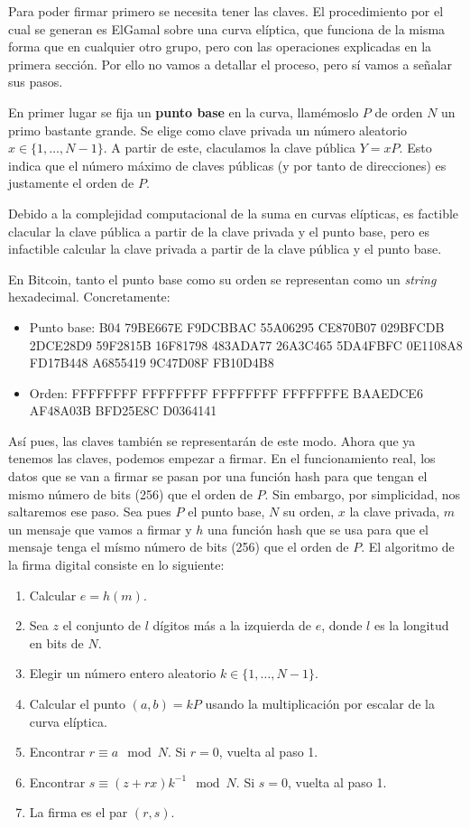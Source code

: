 \documentclass[twoside]{article}
\theoremstyle{definition}
\begin{document}
Para poder firmar primero se necesita tener las claves. El procedimiento por el cual se generan es ElGamal sobre una curva elíptica, que funciona de la misma forma que en cualquier otro grupo, pero con las operaciones explicadas en la primera sección.  Por ello no vamos a detallar el proceso, pero sí vamos a señalar sus pasos. 

En primer lugar se fija un \textbf{punto base} en la curva, llamémoslo $P$ de orden $N$ un primo bastante grande. Se elige como clave privada un número aleatorio $x\in\{1,\dots, N-1\}$. A partir de este, claculamos la clave pública $Y=xP$. Esto indica que el número máximo de claves públicas (y por tanto de direcciones) es justamente el orden de $P$. 

Debido a la complejidad computacional de la suma en curvas elípticas, es factible clacular la clave pública a partir de la clave privada y el punto base, pero es infactible calcular la clave privada a partir de la clave pública y el punto base. 

En Bitcoin, tanto el punto base como su orden se representan como un \emph{string} hexadecimal. Concretamente:
\begin{itemize}
\item Punto base: B04 79BE667E F9DCBBAC 55A06295 CE870B07 029BFCDB 2DCE28D9 59F2815B 16F81798 483ADA77 26A3C465 5DA4FBFC 0E1108A8 FD17B448 A6855419 9C47D08F FB10D4B8
\item Orden:  FFFFFFFF FFFFFFFF FFFFFFFF FFFFFFFE BAAEDCE6 AF48A03B BFD25E8C D0364141
\end{itemize}

Así pues, las claves también se representarán de este modo. Ahora que ya tenemos las claves, podemos empezar a firmar. En el funcionamiento real, los datos que se van a firmar se pasan por una función hash para que tengan el mismo número de bits (256) que el orden de $P$. Sin embargo, por simplicidad, nos saltaremos ese paso. Sea pues $P$ el punto base, $N$ su orden, $x$ la clave privada, $m$ un mensaje que vamos a firmar y $h$ una función hash que se usa para que el mensaje tenga el mísmo número de bits (256) que el orden de $P$. El algoritmo de la firma digital consiste en lo siguiente:
\begin{enumerate}
\item Calcular $e=h(m)$.
\item Sea $z$ el conjunto de $l$ dígitos más a la izquierda de $e$, donde $l$ es la longitud en bits de $N$.
\item Elegir un número entero aleatorio $k\in\{1,\dots,N-1\}$.
\item Calcular el punto $(a,b)=kP$ usando la multiplicación por escalar de la curva elíptica. 
\item Encontrar $r\equiv a\mod N$. Si $r=0$, vuelta al paso 1.
\item Encontrar $s\equiv (z+rx)k^{-1}\mod N$. Si $s=0$, vuelta al paso 1. 
\item La firma es el par $(r,s)$. 
\end{enumerate}
\end{document}
